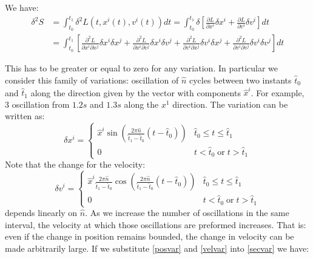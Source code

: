 \documentclass[aps,pra,10pt,floatfix,nofootinbib]{revtex4-1}
\theoremstyle{definition}
\begin{document}
We have:
\begin{align}
\delta^2 S &= \int_{t_0}^{t_1} \delta^2 L(t, x^i(t), v^i(t)) dt = \int_{t_0}^{t_1} \delta \left[\frac{\partial L}{\partial x^i} \delta x^i +  \frac{\partial L}{\partial v^i} \delta v^i \right]dt \nonumber \\
&= \int_{t_0}^{t_1} \left[ \frac{\partial^2 L}{\partial x^i\partial x^j} \delta x^i \delta x^j + \frac{\partial^2 L}{\partial x^i\partial v^j} \delta x^i \delta v^j \right. + \left. \frac{\partial^2 L}{\partial v^i\partial x^j} \delta v^i \delta x^j  + \frac{\partial^2 L}{\partial v^i\partial v^j} \delta v^i \delta v^j\right]dt
\label{secvar}
\end{align}

This has to be greater or equal to zero for any variation. In particular we consider this family of variations: oscillation of $\hat{n}$ cycles between two instants $\hat{t}_0$ and $\hat{t}_1$ along the direction given by the vector with components $\hat{x}^i$. For example, $3$ oscillation from $1.2s$ and $1.3s$ along the $x^1$ direction. The variation can be written as:
\begin{equation}
\label{posvar}
\delta x^i = \left\{
\begin{array}{ll}
\hat{x}^i \sin\left(\frac{2\pi \hat{n}}{\hat{t}_1 - \hat{t}_0} (t-\hat{t}_0)\right)  & \hat{t}_0 \leq t \leq \hat{t}_1 \\
0 & t < \hat{t}_0 \; \textrm{or} \; t > \hat{t}_1
\end{array}
\right.
\end{equation}
Note that the change for the velocity:
\begin{equation}
\label{velvar}
\delta v^i = \left\{
\begin{array}{ll}
\hat{x}^i \frac{2\pi \hat{n}}{\hat{t}_1 - \hat{t}_0} \cos\left(\frac{2\pi \hat{n}}{\hat{t}_1 - \hat{t}_0} (t-\hat{t}_0)\right)  & \hat{t}_0 \leq t \leq \hat{t}_1 \\
0 & t < \hat{t}_0 \; \textrm{or} \; t > \hat{t}_1
\end{array}
\right.
\end{equation}
depends linearly on $\hat{n}$. As we increase the number of oscillations in the same interval, the velocity at which those oscillations are preformed increases. That is: even if the change in position remains bounded, the change in velocity can be made arbitrarily large.  If we substitute \eqref{posvar} and \eqref{velvar} into \eqref{secvar} we have:
\end{document}
